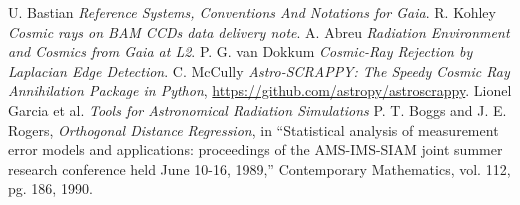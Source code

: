 \documentclass[a4paper, 11pt]{article}
\begin{document}
\begin{thebibliography}{9}
 U. Bastian \emph{Reference Systems, Conventions And Notations for Gaia}.
 R. Kohley \emph{Cosmic rays on BAM CCDs data delivery note}.
 A. Abreu \emph{Radiation Environment and Cosmics from Gaia at L2}.
 P. G. van Dokkum \emph{Cosmic-Ray Rejection by Laplacian Edge Detection}.
 C. McCully \emph{Astro-SCRAPPY: The Speedy Cosmic Ray Annihilation Package in Python}, \url{https://github.com/astropy/astroscrappy}.
 Lionel Garcia et al. \emph{Tools for Astronomical Radiation Simulations}
 P. T. Boggs and J. E. Rogers, \emph{Orthogonal Distance Regression}, in ``Statistical analysis of measurement error models and applications: proceedings of the AMS-IMS-SIAM joint summer research conference held June 10-16, 1989,'' Contemporary Mathematics, vol. 112, pg. 186, 1990.


\end{thebibliography}
\end{document}
